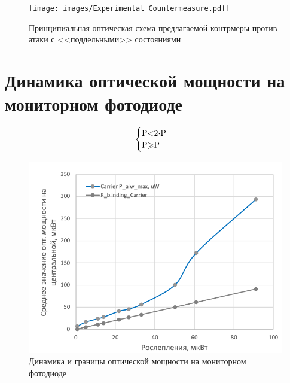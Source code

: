  \begin{figure}[ht]
  \centering
  \texttt{[image: images/Experimental Countermeasure.pdf]}
  \caption{Принципиальная оптическая схема предлагаемой контрмеры против атаки с <<поддельными>> состояниями}
  \label{fig:Experimental_countermeasure}
\end{figure}


\pagebreak
\section{Динамика оптической мощности на мониторном фотодиоде}



\[
    \begin{cases}
     $P$ < $2$ \cdot $P$ \\
     $P$ \geqslant  $P$ 
    \end{cases}
\]

 \begin{figure}[ht]
  \centering
  \includegraphics{images/Watchdog_photodiode.png}
  \caption{Динамика и границы оптической мощности на мониторном фотодиоде}
  \label{fig:Watchdog_photodiode}
\end{figure}


\pagebreak
